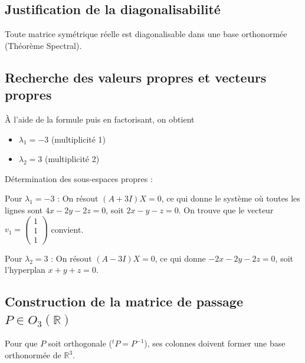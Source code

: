 \documentclass[french]{yLectureNote}
\begin{document}
\subsection{Justification de la diagonalisabilité}
\begin{theorem}
Toute matrice symétrique réelle est diagonalisable dans une base orthonormée (Théorème Spectral).
\end{theorem}



\subsection{Recherche des valeurs propres et vecteurs propres}

À l'aide de la formule puis en factorisant, on obtient
\begin{itemize}
    \item $\lambda_1 = -3$ (multiplicité 1)
    \item $\lambda_2 = 3$ (multiplicité 2)
\end{itemize}

Détermination des sous-espaces propres :

Pour $\lambda_1 = -3$ : On résout $(A + 3I)X = 0$, ce qui donne le système où toutes les lignes sont $4x - 2y - 2z = 0$, soit $2x - y - z = 0$. On trouve que le vecteur $v_1 = \begin{pmatrix} 1 \\ 1 \\ 1 \end{pmatrix}$ convient.

Pour $\lambda_2 = 3$ : On résout $(A - 3I)X = 0$, ce qui donne $-2x - 2y - 2z = 0$, soit l'hyperplan $x + y + z = 0$.


\subsection{Construction de la matrice de passage $P \in O_3(\mathbb{R})$}

Pour que $P$ soit orthogonale ($^tP = P^{-1}$), ses colonnes doivent former une base orthonormée de $\mathbb{R}^3$.
\end{document}
